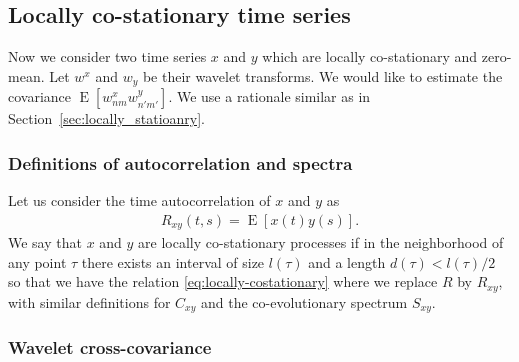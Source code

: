 \documentclass{article}
\begin{document}


\subsection{Locally co-stationary time series}

Now we consider two time series $x$ and $y$ which are locally co-stationary and zero-mean. Let $w^{x}$ and $w_{y}$ be their wavelet transforms. We would like to estimate the covariance $\operatorname{E}[w^{x}_{nm}w^{y}_{n'm'}]$. We use a rationale similar as in Section~\ref{sec:locally_statioanry}.

\subsubsection{Definitions of autocorrelation and spectra}
Let us consider the time autocorrelation of $x$ and $y$ as
\begin{eqnarray}
    R_{xy}(t, s) = \operatorname{E}\left[x(t) y(s)\right].
\end{eqnarray}
We say that $x$ and $y$ are locally co-stationary processes if in the neighborhood of any point $\tau$ there exists an interval of size $l(\tau)$ and a length $d(\tau) < l(\tau)/2$ so that we have the relation \eqref{eq:locally-costationary} where we replace $R$ by $R_{xy}$, with similar definitions for $C_{xy}$ and the co-evolutionary spectrum $S_{xy}$.

\subsubsection{Wavelet cross-covariance}
\end{document}
